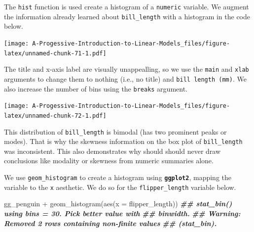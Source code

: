 \documentclass[
]{book}
\newenvironment{Shaded}{\begin{snugshade}}{\end{snugshade}}
\newcommand{\AttributeTok}[1]{\textcolor[rgb]{0.77,0.63,0.00}{#1}}
\newcommand{\DecValTok}[1]{\textcolor[rgb]{0.00,0.00,0.81}{#1}}
\newcommand{\DocumentationTok}[1]{\textcolor[rgb]{0.56,0.35,0.01}{\textbf{\textit{#1}}}}
\newcommand{\FunctionTok}[1]{\textcolor[rgb]{0.00,0.00,0.00}{#1}}
\newcommand{\NormalTok}[1]{#1}
\newcommand{\SpecialCharTok}[1]{\textcolor[rgb]{0.00,0.00,0.00}{#1}}
\newcommand{\StringTok}[1]{\textcolor[rgb]{0.31,0.60,0.02}{#1}}
\theoremstyle{definition}
\theoremstyle{definition}
\theoremstyle{definition}
\theoremstyle{definition}
\theoremstyle{remark}
\begin{document}
The \texttt{hist} function is used create a histogram of a \texttt{numeric} variable. We augment the information already learned about \texttt{bill\_length} with a histogram in the code below.

\begin{Shaded}
\end{Shaded}

\texttt{[image: A-Progessive-Introduction-to-Linear-Models\_files/figure-latex/unnamed-chunk-71-1.pdf]}

The title and x-axis label are visually unappealling, so we use the \texttt{main} and \texttt{xlab} arguments to change them to nothing (i.e., no title) and \texttt{bill\ length\ (mm)}. We also increase the number of bins using the \texttt{breaks} argument.

\begin{Shaded}
\end{Shaded}

\texttt{[image: A-Progessive-Introduction-to-Linear-Models\_files/figure-latex/unnamed-chunk-72-1.pdf]}

This distribution of \texttt{bill\_length} is bimodal (has two prominent peaks or modes). That is why the skewness information on the box plot of \texttt{bill\_length} was inconsistent. This also demonstrates why should should never draw conclusions like modality or skewness from numeric summaries alone.

We use \texttt{geom\_histogram} to create a histogram using \textbf{\texttt{ggplot2}}, mapping the variable to the \texttt{x} aesthetic. We do so for the \texttt{flipper\_length} variable below.

\begin{Shaded}
\begin{Highlighting}[]
\NormalTok{gg\_penguin }\SpecialCharTok{+} \FunctionTok{geom\_histogram}\NormalTok{(}\FunctionTok{aes}\NormalTok{(}\AttributeTok{x =}\NormalTok{ flipper\_length))}
\DocumentationTok{\#\# \textasciigrave{}stat\_bin()\textasciigrave{} using \textasciigrave{}bins = 30\textasciigrave{}. Pick better value with}
\DocumentationTok{\#\# \textasciigrave{}binwidth\textasciigrave{}.}
\DocumentationTok{\#\# Warning: Removed 2 rows containing non{-}finite values}
\DocumentationTok{\#\# (stat\_bin).}
\end{Highlighting}
\end{Shaded}
\end{document}
